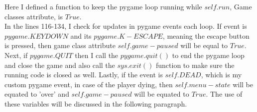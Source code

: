 \documentclass[12pt]{article}
\begin{document}
\vspace{3em}
Here I defined a function to keep the pygame loop running while $self.run$, Game classes attribute, is $True$.\\
In the lines 116-134, I check for updates in pygame events each loop. If event is $pygame.KEYDOWN$ and its $pygame.K-ESCAPE$, meaning the escape button is pressed, then game class attribute $self.game-paused$ will be equal to $True$. Next, if $pygame.QUIT$ then I call the $pygame.quit()$ to end the pygame loop and close the game and also call the $sys.exit()$ function to make sure the running code is closed as well. Lastly, if the event is $self.DEAD$, which is my custom pygame event, in case of the player dying, then $self.menu-state$ will be equated to 'over' and $self.game-paused$ will be equated to $True$. The use of these variables will be discussed in the following paragraph. \\
\end{document}

